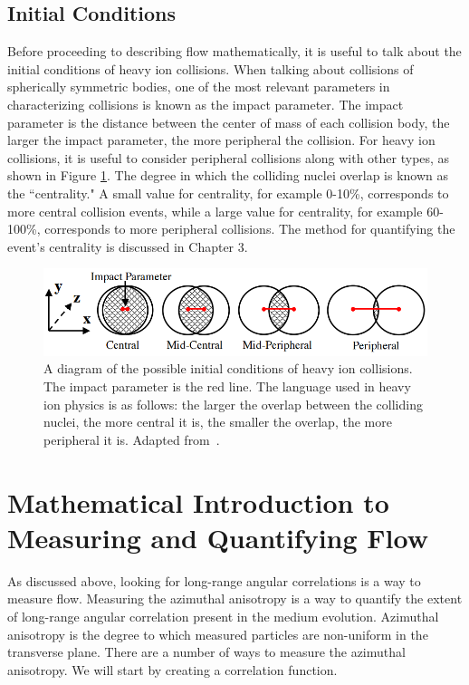 \subsection{Initial Conditions}
\label{sec:initial_condition}
Before proceeding to describing flow mathematically, it is useful to talk about the initial conditions of heavy ion collisions. When talking about collisions of spherically symmetric bodies, one of the most relevant parameters in characterizing collisions is known as the impact parameter. The impact parameter is the distance between the center of mass of each collision body, the larger the impact parameter, the more peripheral the collision. For heavy ion collisions, it is useful to consider peripheral collisions along with other types, as shown in Figure \ref{fig:centrality_diagram}. The degree in which the colliding nuclei overlap is known as the ``centrality." A small value for centrality, for example 0-10\%, corresponds to more central collision events, while a large value for centrality, for example 60-100\%, corresponds to more peripheral collisions. The method for quantifying the event's centrality is discussed in Chapter 3.
\begin{figure}[!ht]
\begin{center}
\includegraphics[width=0.65\linewidth]{figs/centrality_impact_parameter_diagram.PNG}
\caption{A diagram of the possible initial conditions of heavy ion collisions. The impact parameter is the red line. The language used in heavy ion physics is as follows: the larger the overlap between the colliding nuclei, the more central it is, the smaller the overlap, the more peripheral it is. Adapted from~\cite{Richardson:2012pka}.}
\label{fig:centrality_diagram}
\end{center}
\end{figure}


\section{Mathematical Introduction to Measuring and Quantifying Flow}
As discussed above, looking for long-range angular correlations is a way to measure flow. Measuring the azimuthal anisotropy is a way to quantify the extent of long-range angular correlation present in the medium evolution. Azimuthal anisotropy is the degree to which measured particles are non-uniform in the transverse plane. There are a number of ways to measure the azimuthal anisotropy. We will start by creating a correlation function. 

